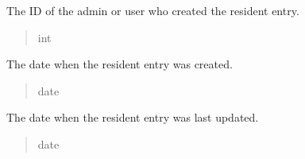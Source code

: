 \documentclass[letterpaper,10pt,english]{sphinxmanual}
\begin{document}
\begin{fulllineitems}
\begin{fulllineitems}
\label{\detokenize{app.mysql:app.mysql.resident.Resident.createdBy}}
\pysigstartsignatures
\pysigline
{}
\pysigstopsignatures
\sphinxAtStartPar
The ID of the admin or user who created the resident entry.
\begin{quote}\begin{description}
\sphinxAtStartPar
int

\end{description}\end{quote}

\end{fulllineitems}


\begin{fulllineitems}
\label{\detokenize{app.mysql:app.mysql.resident.Resident.createDate}}
\pysigstartsignatures
\pysigline
{}
\pysigstopsignatures
\sphinxAtStartPar
The date when the resident entry was created.
\begin{quote}\begin{description}
\sphinxAtStartPar
date

\end{description}\end{quote}

\end{fulllineitems}


\begin{fulllineitems}
\label{\detokenize{app.mysql:app.mysql.resident.Resident.update}}
\pysigstartsignatures
\pysigline
{}
\pysigstopsignatures
\sphinxAtStartPar
The date when the resident entry was last updated.
\begin{quote}\begin{description}
\sphinxAtStartPar
date

\end{description}\end{quote}

\end{fulllineitems}


\end{fulllineitems}
\end{document}
